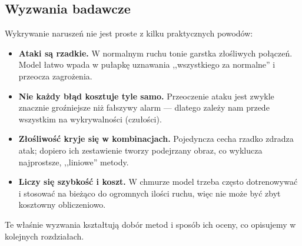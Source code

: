 \subsection{Wyzwania badawcze}

Wykrywanie naruszeń nie jest proste z kilku praktycznych powodów:
\begin{itemize}
  \item \textbf{Ataki są rzadkie.} W normalnym ruchu tonie garstka złośliwych
        połączeń. Model łatwo wpada w pułapkę uznawania ,,wszystkiego za
        normalne'' i przeocza zagrożenia.
  \item \textbf{Nie każdy błąd kosztuje tyle samo.} Przeoczenie ataku jest
        zwykle znacznie groźniejsze niż fałszywy alarm --- dlatego zależy nam
        przede wszystkim na wykrywalności (czułości).
  \item \textbf{Złośliwość kryje się w kombinacjach.} Pojedyncza cecha rzadko
        zdradza atak; dopiero ich zestawienie tworzy podejrzany obraz, co
        wyklucza najprostsze, ,,liniowe'' metody.
  \item \textbf{Liczy się szybkość i koszt.} W chmurze model trzeba często
        dotrenowywać i stosować na bieżąco do ogromnych ilości ruchu, więc nie
        może być zbyt kosztowny obliczeniowo.
\end{itemize}

Te właśnie wyzwania kształtują dobór metod i sposób ich oceny, co opisujemy w
kolejnych rozdziałach.
